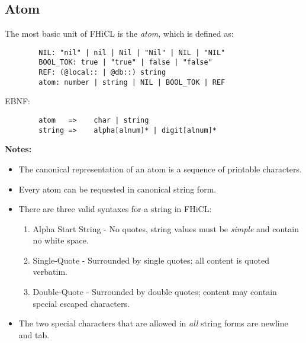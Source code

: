 \documentclass{memarticle}
\begin{document}
{                \subsection{Atom}
                        The most basic unit of FHiCL is the \emph{atom},
                        which is defined as: 
                \begin{verbatim}
        NIL: "nil" | nil | Nil | "Nil" | NIL | "NIL"
        BOOL_TOK: true | "true" | false | "false"
        REF: (@local:: | @db::) string
        atom: number | string | NIL | BOOL_TOK | REF
                \end{verbatim}
                        EBNF:
                \begin{verbatim}
        atom   =>    char | string
        string =>    alpha[alnum]* | digit[alnum]*
                \end{verbatim}
                        \par
                        \textbf{ Notes: }
                        \begin{itemize}
                                \item The canonical representation of an atom is a sequence of printable characters.
                                \item Every atom can be requested in canonical string form.
                                \item There are three valid syntaxes for a string in FHiCL:
                                \begin{enumerate}
                                        \item Alpha Start String - No quotes, string values must be \emph{simple}
                                                and contain no white space.
                                        \item Single-Quote - Surrounded by single quotes;
                                                all content is quoted verbatim.
                                        \item Double-Quote - Surrounded by double quotes;
                                                content may contain special escaped characters.
                                \end{enumerate}
                                \item The two special characters that are allowed in \emph{all} string forms are newline and tab.
                        \end{itemize}
                        
}
\end{document}
